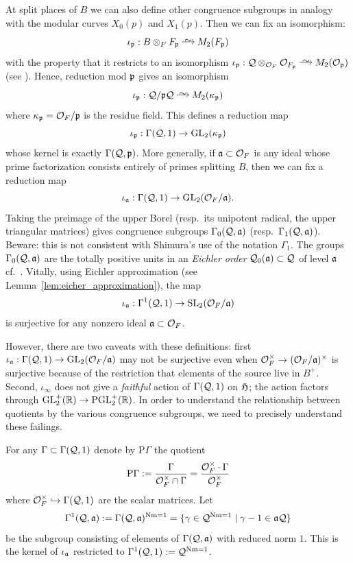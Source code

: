 \documentclass[main.tex]{subfiles}
\begin{document}
At split places of $B$ we can also define other congruence subgroups in analogy with the modular curves $X_0(p)$ and $X_1(p)$. Then we can fix an isomorphism:
\[ \iota_{\p} : B \ot_F F_{\p} \iso M_2(F_{\p}) \]
with the property that it restricts to an isomorphism $\iota_{\p} : \cQ \ot_{\cO_F} \cO_{F_\p} \iso M_2(\cO_{\p})$ (see \cite[Lemma~10.4.3]{voight:quaternion_algebras}).
Hence, reduction mod $\p$ gives an isomorphism
\[ \iota_{\p} : \cQ / \p \cQ \iso M_2(\kappa_{\p}) \]
where $\kappa_{\p} = \cO_F / \p$ is the residue field. This defines a reduction map
\[ \iota_{\p} : \Gamma(\cQ, 1) \to \GL_2(\kappa_{\p}) \]
whose kernel is exactly $\Gamma(\cQ, \p)$. More generally, if $\aa \subset \cO_F$ is any ideal whose prime factorization consists entirely of primes splitting $B$, then we can fix a reduction map
\[ \iota_{\aa} : \Gamma(\cQ, 1) \to \GL_2(\cO_F / \aa).  \]
Taking the preimage of the upper Borel (resp.\ its unipotent radical, the upper triangular matrices) gives congruence subgroups $\Gamma_0(\cQ, \aa)$ (resp.\ $\Gamma_1(\cQ, \aa)$). Beware: this is not consistent with Shimura's use of the notation $\Gamma_1$. The groups $\Gamma_0(\cQ, \aa)$ are the totally positive units in an \textit{Eichler order} $\cQ_0(\aa) \subset \cQ$ of level $\aa$ cf.\ \cite[\S3]{Voight:explicit_methods}. Vitally, using Eichler approximation (see Lemma~\ref{lem:eicher_approximation}), the map 
\[ \iota_{\aa} : \Gamma^1(\cQ, 1) \to \SL_2(\cO_F / \aa)  \]
is surjective for any nonzero ideal $\aa \subset \cO_F$. 
\par
However, there are two caveats with these definitions: first $\iota_{\aa} : \Gamma(\cQ, 1) \to \GL_2(\cO_F / \aa)$ may not be surjective even when $\cO_F^\times \to (\cO_F / \aa)^{\times}$ is surjective because of the restriction that elements of the source live in $B^+$. Second, $\iota_{\infty}$ does not give a \textit{faithful} action of $\Gamma(\cQ, 1)$ on $\frH$; the action factors through $\GL_2^+(\RR) \to \PGL_2^+(\RR)$. In order to understand the relationship between quotients by the various congruence subgroups, we need to precisely understand these failings.
\par
For any $\Gamma \subset \Gamma(\cQ, 1)$ denote by $\mathrm{P} \Gamma$ the quotient
\[ \mathrm{P} \Gamma := \frac{\Gamma}{\cO_F^\times \cap \Gamma} = \frac{\cO_F^{\times} \cdot \Gamma}{\cO_F^{\times}} \]
where $\cO_F^\times \embed \Gamma(\cQ, 1)$ are the scalar matrices. Let
\[ \Gamma^1(\cQ, \aa) := \Gamma(\cQ, \aa)^{\Nm = 1} = \{ \gamma \in \cQ^{\Nm = 1} \mid \gamma - 1 \in \aa \cQ \} \]
be the subgroup consisting of elements of $\Gamma(\cQ, \aa)$ with reduced norm $1$. This is the kernel of $\iota_{\aa}$ restricted to $\Gamma^1(\cQ, 1) := \cQ^{\Nm = 1}$.
\end{document}
